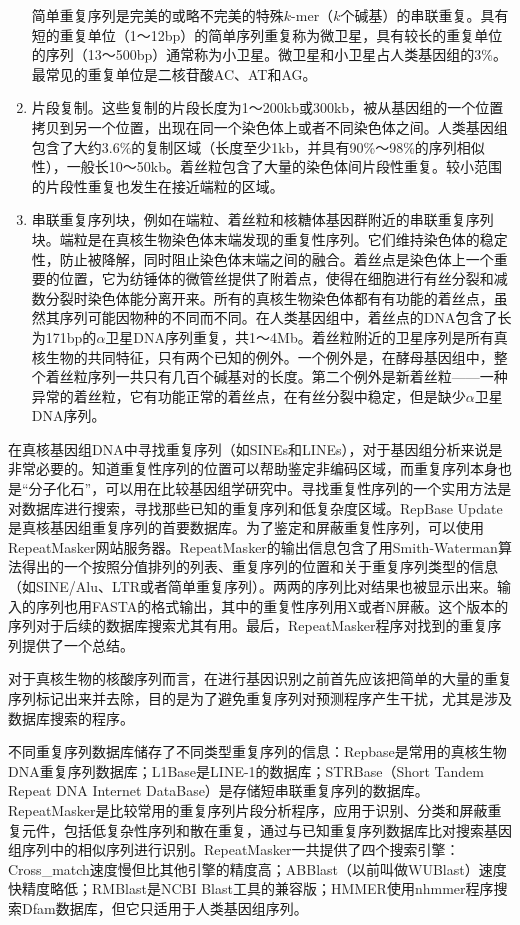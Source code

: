 \documentclass[11pt,a4paper,twoside]{book}
\begin{document}
\begin{enumerate}
    简单重复序列是完美的或略不完美的特殊$k$-mer（$k$个碱基）的串联重复。具有短的重复单位（1～12bp）的简单序列重复称为微卫星，具有较长的重复单位的序列（13～500bp）通常称为小卫星。微卫星和小卫星占人类基因组的3\%。最常见的重复单位是二核苷酸AC、AT和AG。
  \item 片段复制。这些复制的片段长度为1～200kb或300kb，被从基因组的一个位置拷贝到另一个位置，出现在同一个染色体上或者不同染色体之间。人类基因组包含了大约3.6\%的复制区域（长度至少1kb，并具有90\%～98\%的序列相似性），一般长10～50kb。着丝粒包含了大量的染色体间片段性重复。较小范围的片段性重复也发生在接近端粒的区域。
  \item 串联重复序列块，例如在端粒、着丝粒和核糖体基因群附近的串联重复序列块。端粒是在真核生物染色体末端发现的重复性序列。它们维持染色体的稳定性，防止被降解，同时阻止染色体末端之间的融合。着丝点是染色体上一个重要的位置，它为纺锤体的微管丝提供了附着点，使得在细胞进行有丝分裂和减数分裂时染色体能分离开来。所有的真核生物染色体都有有功能的着丝点，虽然其序列可能因物种的不同而不同。在人类基因组中，着丝点的DNA包含了长为171bp的$\alpha$卫星DNA序列重复，共1～4Mb。着丝粒附近的卫星序列是所有真核生物的共同特征，只有两个已知的例外。一个例外是，在酵母基因组中，整个着丝粒序列一共只有几百个碱基对的长度。第二个例外是新着丝粒——一种异常的着丝粒，它有功能正常的着丝点，在有丝分裂中稳定，但是缺少$\alpha$卫星DNA序列。
\end{enumerate}

在真核基因组DNA中寻找重复序列（如SINEs和LINEs），对于基因组分析来说是非常必要的。知道重复性序列的位置可以帮助鉴定非编码区域，而重复序列本身也是“分子化石”，可以用在比较基因组学研究中。寻找重复性序列的一个实用方法是对数据库进行搜索，寻找那些已知的重复序列和低复杂度区域。RepBase Update是真核基因组重复序列的首要数据库。为了鉴定和屏蔽重复性序列，可以使用RepeatMasker网站服务器。RepeatMasker的输出信息包含了用Smith-Waterman算法得出的一个按照分值排列的列表、重复序列的位置和关于重复序列类型的信息（如SINE/Alu、LTR或者简单重复序列）。两两的序列比对结果也被显示出来。输入的序列也用FASTA的格式输出，其中的重复性序列用X或者N屏蔽。这个版本的序列对于后续的数据库搜索尤其有用。最后，RepeatMasker程序对找到的重复序列提供了一个总结。



对于真核生物的核酸序列而言，在进行基因识别之前首先应该把简单的大量的重复序列标记出来并去除，目的是为了避免重复序列对预测程序产生干扰，尤其是涉及数据库搜索的程序。

不同重复序列数据库储存了不同类型重复序列的信息：Repbase是常用的真核生物DNA重复序列数据库；L1Base是LINE-1的数据库；STRBase（Short Tandem Repeat DNA Internet DataBase）是存储短串联重复序列的数据库。RepeatMasker是比较常用的重复序列片段分析程序，应用于识别、分类和屏蔽重复元件，包括低复杂性序列和散在重复，通过与已知重复序列数据库比对搜索基因组序列中的相似序列进行识别。RepeatMasker一共提供了四个搜索引擎：Cross\_match速度慢但比其他引擎的精度高；ABBlast（以前叫做WUBlast）速度快精度略低；RMBlast是NCBI Blast工具的兼容版；HMMER使用nhmmer程序搜索Dfam数据库，但它只适用于人类基因组序列。
\end{document}
